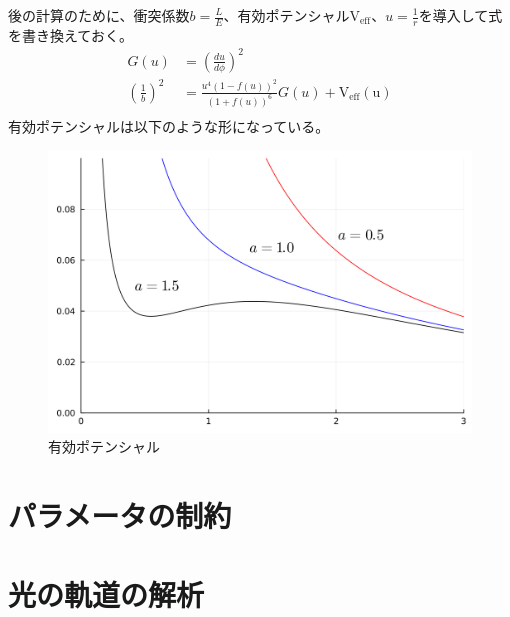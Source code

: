\documentclass[dvipdfmx]{report} %
\begin{document}
後の計算のために、衝突係数$b = \frac{L}{E}$、有効ポテンシャル$\mathrm{V_{eff}}$、$u=\frac{1}{r}$を導入して式を書き換えておく。
\begin{equation*}
\begin{split}
	G(u) 	&= \left( \frac{du}{d\phi} \right)^2\\ 
	\left( \frac{1}{b} \right)^2 &=
			\frac{u^4 (1-f(u))^2}{(1+f(u))^6} G(u)
			+ \mathrm{V_{eff}(u)}\\
\end{split}
\end{equation*}
有効ポテンシャルは以下のような形になっている。
\begin{figure}[H]
    \centering
    \includegraphics[width=0.5\columnwidth]{./images/buch/v-eff.png}
    \caption{有効ポテンシャル}
    \label{}
\end{figure}

\section{パラメータの制約}

\section{光の軌道の解析}
\end{document}
